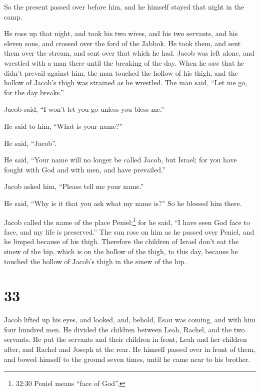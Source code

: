  So the present passed over before him, and he himself
stayed that night in the camp.

 He rose up that night, and took his two wives, and his two
servants, and his eleven sons, and crossed over the ford of the Jabbok.
 He took them, and sent them over the stream, and sent over
that which he had.  Jacob was left alone, and wrestled with
a man there until the breaking of the day.  When he saw
that he didn't prevail against him, the man touched the hollow of his
thigh, and the hollow of Jacob's thigh was strained as he wrestled.
 The man said, ``Let me go, for the day breaks.''

Jacob said, ``I won't let you go unless you bless me.''

 He said to him, ``What is your name?''

He said, ``Jacob''.

 He said, ``Your name will no longer be called Jacob, but
Israel; for you have fought with God and with men, and have prevailed.''

 Jacob asked him, ``Please tell me your name.''

He said, ``Why is it that you ask what my name is?'' So he blessed him
there.

 Jacob called the name of the place Peniel;\footnote{32:30
  Peniel means ``face of God''.} for he said, ``I have seen God face to
face, and my life is preserved.''  The sun rose on him as
he passed over Peniel, and he limped because of his thigh. 
Therefore the children of Israel don't eat the sinew of the hip, which
is on the hollow of the thigh, to this day, because he touched the
hollow of Jacob's thigh in the sinew of the hip.

\hypertarget{section-32}{%
\section{33}\label{section-32}}

 Jacob lifted up his eyes, and looked, and, behold, Esau was
coming, and with him four hundred men. He divided the children between
Leah, Rachel, and the two servants.  He put the servants and
their children in front, Leah and her children after, and Rachel and
Joseph at the rear.  He himself passed over in front of
them, and bowed himself to the ground seven times, until he came near to
his brother.

